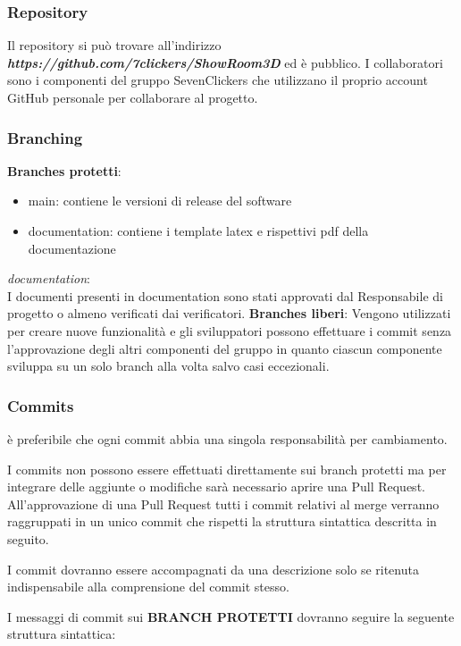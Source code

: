 \subsubsection{Repository}
Il repository si può trovare all'indirizzo \textbf{\textit{https://github.com/7clickers/ShowRoom3D}} ed è pubblico. 
I collaboratori sono i componenti del gruppo SevenClickers che utilizzano il proprio account GitHub personale per collaborare al progetto.
\subsubsection{Branching}
\textbf{Branches protetti}:
    \begin{itemize} 
        \item main: contiene le versioni di release del software
        \item documentation: contiene i template latex e rispettivi pdf della documentazione
    \end{itemize}
\textit{documentation}:\\
I documenti presenti in documentation sono stati approvati dal Responsabile di progetto o almeno verificati dai verificatori.
\textbf{Branches liberi}: 
Vengono utilizzati per creare nuove funzionalità e gli sviluppatori possono effettuare i commit senza l'approvazione degli altri componenti del gruppo
in quanto ciascun componente sviluppa su un solo branch alla volta salvo casi eccezionali.
\subsubsection{Commits}
è preferibile che ogni commit abbia una singola responsabilità per cambiamento.

I commits non possono essere effettuati direttamente sui branch protetti ma per integrare delle aggiunte o modifiche sarà necessario aprire una Pull Request.
All'approvazione di una Pull Request tutti i commit relativi al merge verranno raggruppati in un unico commit che rispetti la struttura sintattica descritta in seguito.

I commit dovranno essere accompagnati da una descrizione solo se ritenuta indispensabile alla comprensione del commit stesso.

I messaggi di commit sui \textbf{\uppercase{branch protetti}} dovranno seguire la seguente struttura sintattica:\\

